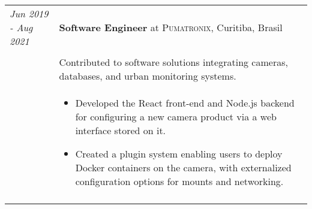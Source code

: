 \documentclass[a4paper,10pt]{article}
\begin{document}
    \begin{tabular}{@{} p{2.8cm} | p{12.2cm} @{}}
        \emph{Jun 2019 - Aug 2021}
        &\textbf{Software Engineer} at \textsc
        {Pumatronix}, Curitiba, Brasil \\ \\

        &\normalsize
        {
            Contributed to software solutions integrating cameras,
            databases, and urban monitoring systems.
        } \\
        & \begin{itemize}[leftmargin=*]
            \item Developed the React front-end and Node.js backend for
                configuring a new camera product via a web interface
                stored on it.

            \item Created a plugin system enabling users to deploy Docker
                containers on the camera, with externalized configuration
                options for mounts and networking.

        \end{itemize} \\
        \multicolumn{2}{c}{}
    \end{tabular}
\end{document}
